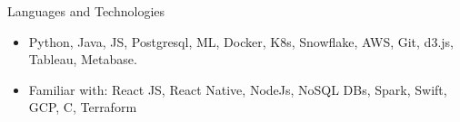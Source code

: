\documentclass[]{ahmedamrcv}
\begin{document}
	\begin{cvsection}{Languages and Technologies}
		\begin{cvsubsection}{}{}{}	
			\begin{itemize}
				\item Python, Java, JS, Postgresql, ML, Docker, K8s, Snowflake, AWS, Git, d3.js, Tableau, Metabase.
				\item Familiar with: React JS, React Native, NodeJs, NoSQL DBs, Spark, Swift, GCP, C, Terraform
			\end{itemize}
		\end{cvsubsection}
	\end{cvsection}
\end{document}
